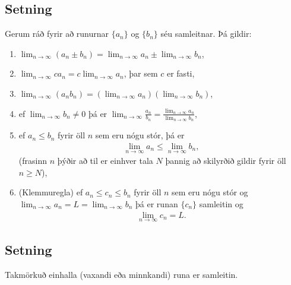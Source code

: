 \documentclass[a4paper,10pt,icelandic]{sphinxmanual}
\begin{document}
\subsection{Setning}
\label{\detokenize{kafli09:id4}}
Gerum ráð fyrir að runurnar \(\{a_n\}\) og \(\{b_n\}\) séu
samleitnar. Þá gildir:
\begin{enumerate}
\item {} 
\(\lim_{n\rightarrow\infty}(a_n\pm b_n)=
\lim_{n\rightarrow\infty}a_n\pm\lim_{n\rightarrow\infty}b_n\),

\item {} 
\(\lim_{n\rightarrow\infty}ca_n=
c\lim_{n\rightarrow\infty}a_n\), þar sem \(c\) er fasti,

\item {} 
\(\lim_{n\rightarrow\infty}(a_n b_n)=
(\lim_{n\rightarrow\infty}a_n)(\lim_{n\rightarrow\infty}b_n)\),

\item {} 
ef \(\lim_{n\rightarrow\infty}b_n\neq 0\) þá er
\(\lim_{n\rightarrow\infty}\frac{a_n}{b_n}=
\frac{\lim_{n\rightarrow\infty}a_n}{\lim_{n\rightarrow\infty}b_n}\),

\item {} 
ef \(a_n\leq b_n\) fyrir öll \(n\) sem eru nógu stór, þá
er
\begin{equation*}
\begin{split}\lim_{n\rightarrow\infty}a_n\leq\lim_{n\rightarrow\infty}b_n,\end{split}
\end{equation*}
(frasinn  \(n\)  þýðir að til er
einhver tala \(N\) þannig að skilyrðið gildir fyrir öll
\(n\geq N\)),

\item {} 
(Klemmuregla) ef \(a_n\leq c_n\leq b_n\) fyrir öll \(n\)
sem eru nógu stór og
\(\lim_{n\rightarrow\infty}a_n=L=\lim_{n\rightarrow\infty}b_n\)
þá er runan \(\{c_n\}\) samleitin og
\begin{equation*}
\begin{split}\lim_{n\rightarrow\infty}c_n=L.\end{split}
\end{equation*}
\end{enumerate}


\subsection{Setning}
\label{\detokenize{kafli09:id5}}
Takmörkuð einhalla (vaxandi eða minnkandi) runa er samleitin.
\end{document}
